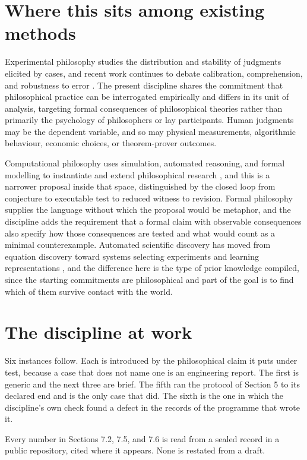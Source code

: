 \documentclass[11pt]{article}
\theoremstyle{remark}
\begin{document}
\section{Where this sits among existing methods}

Experimental philosophy studies the distribution and stability of judgments
elicited by cases, and recent work continues to debate calibration, comprehension,
and robustness to error \citep{knobe2024,irikefe2025,cova2025}. The present
discipline shares the commitment that philosophical practice can be interrogated
empirically and differs in its unit of analysis, targeting formal consequences of
philosophical theories rather than primarily the psychology of philosophers or lay
participants. Human judgments may be the dependent variable, and so may physical
measurements, algorithmic behaviour, economic choices, or theorem-prover outcomes.

Computational philosophy uses simulation, automated reasoning, and formal modelling
to instantiate and extend philosophical research \citep{thagard2024}, and this is a
narrower proposal inside that space, distinguished by the closed loop from
conjecture to executable test to reduced witness to revision. Formal philosophy
supplies the language without which the proposal would be metaphor, and the
discipline adds the requirement that a formal claim with observable consequences
also specify how those consequences are tested and what would count as a minimal
counterexample. Automated scientific discovery has moved from equation discovery
toward systems selecting experiments and learning representations
\citep{kramer2026}, and the difference here is the type of prior knowledge
compiled, since the starting commitments are philosophical and part of the goal is
to find which of them survive contact with the world.

\section{The discipline at work}

Six instances follow. Each is introduced by the philosophical claim it puts under
test, because a case that does not name one is an engineering report. The first is
generic and the next three are brief. The fifth ran the protocol of Section 5 to
its declared end and is the only case that did. The sixth is the one in which the
discipline's own check found a defect in the records of the programme that wrote
it.

Every number in Sections 7.2, 7.5, and 7.6 is read from a sealed record in a public
repository, cited where it appears. None is restated from a draft.
\end{document}

